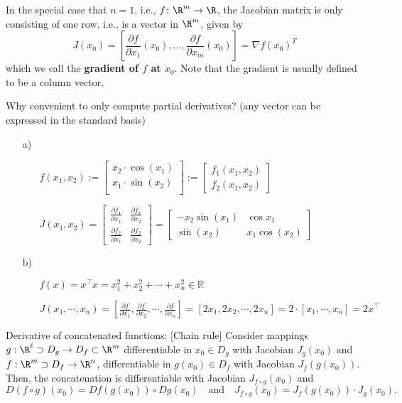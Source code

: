 \newpage
In the special case that $n=1$, i.e., $f\colon \R^m \to \R$, the Jacobian matrix is only consisting of one row, i.e., is a vector in $\R^m$, given by
$$J(x_0) = \left[\frac{\partial f}{\partial x_1}(x_0), \ldots,\frac{\partial f}{\partial x_m}(x_0) \right] = \nabla f(x_0)^T  $$
which we call the \textbf{\color{defgruen}gradient of $f$ at $x_0$}. Note that the gradient is usually defined to be a column vector.
\begin{bsp} 
	\blank
	Why convenient to only compute partial derivatives? (any vector can be expressed in the standard basis)\\[-1cm]
	\begin{itemize}
		\item[a)] \begin{itemize}
			\item[] $f(x_1,x_2) := \begin{bmatrix}
			x_2 \cdot \cos{(x_1)}\\
			x_1 \cdot \sin{(x_2)}\\
			\end{bmatrix} := \begin{bmatrix}
			f_1(x_1,x_2)\\
			f_2(x_1,x_2)
			\end{bmatrix}$\\
			\item[] $J(x_1,x_2) = \begin{bmatrix}
			\frac{\partial f_1}{\partial x_1} & \frac{\partial f_1}{\partial x_2}\\
			\frac{\partial f_2}{\partial x_1} & \frac{\partial f_2}{\partial x_2}
			\end{bmatrix} = \begin{bmatrix}
			-x_2\sin{(x_1)} & \cos{x_1}\\
			\sin{(x_2)} & x_1 \cos{(x_2)}
			\end{bmatrix}$
		\end{itemize}
		\item[b)]\begin{itemize}
			\item[] $f(x) = x^\top x = x_1^2 + x_2^2 + \cdots + x_n^2 \in \mathbb{R}$\\
			\item[] $J(x_1,\cdots,x_n) = [\frac{\partial f}{\partial x_1}, \frac{\partial f}{\partial x_2}, \cdots, \frac{\partial f}{\partial x_n}] = [2x_1,2x_2,\cdots, 2x_n] = 2\cdot[x_1,\cdots,x_n]=2x^\top$
		\end{itemize}
	\end{itemize}
\end{bsp}
%
%
\newpage
Derivative of concatenated functions:
[Chain rule] \label{chain}Consider mappings $g:\R^\ell\supset D_g\to D_f\subset\R^m$ differentiable in $x_0\in D_g$ with Jacobian $J_g(x_0)$ and $f:\R^m\supset D_f\to \R^n$, differentiable in $g(x_0)\in D_f$ with Jacobian $J_f(g(x_0))$. Then, the concatenation is differentiable with Jacobian $J_{f\circ g}(x_0)$ and
\[
D(f\circ g)(x_0)=Df(g(x_0))\circ Dg(x_0)\text{~~~and~~~}
\boxed{J_{f\circ g}(x_0)=J_f(g(x_0))\cdot J_g(x_0)}.
\]

